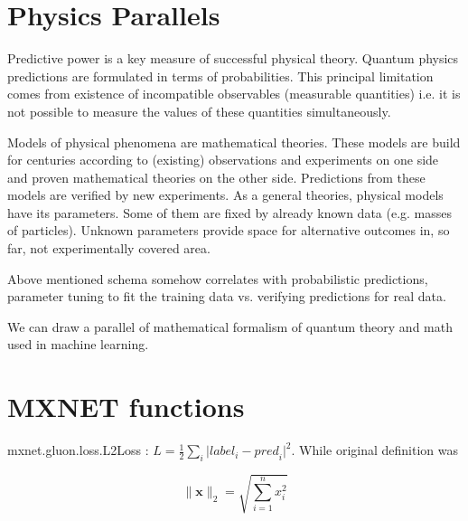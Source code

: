 \documentclass[12pt]{article}
\begin{document}
\section{Physics Parallels}

Predictive power is a key measure of successful physical theory. Quantum physics predictions are formulated in terms of
probabilities. This principal limitation comes from existence of incompatible observables
(measurable quantities) i.e. it is not possible to measure the values of these quantities simultaneously.

Models of physical phenomena are mathematical theories. These models are build for centuries according to
(existing) observations and experiments on one side and proven mathematical theories on the other side.
Predictions from these models are verified by new experiments. As a general theories, physical models have its parameters.
Some of them are fixed by already known data (e.g. masses of particles). Unknown parameters provide space for
alternative outcomes in, so far, not experimentally covered area.

Above mentioned schema somehow correlates with probabilistic predictions, parameter tuning to fit the training data
vs. verifying predictions for real data.

We can draw a parallel of mathematical formalism of quantum theory and math used in machine learning.

\section{MXNET functions}

mxnet.gluon.loss.L2Loss : $L = \frac{1}{2} \sum_i \vert {label}_i - {pred}_i \vert^2$. While original definition was

\[\|\mathbf{x}\|_2 = \sqrt{\sum_{i=1}^n x_i^2}\]
\end{document}
